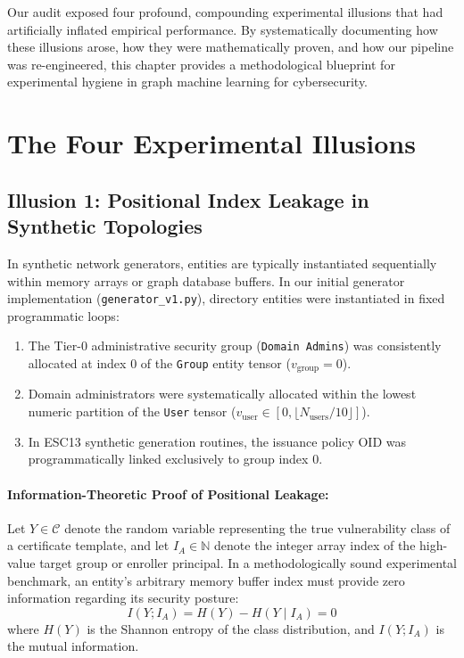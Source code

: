 Our audit exposed four profound, compounding experimental illusions that had artificially inflated empirical performance. By systematically documenting how these illusions arose, how they were mathematically proven, and how our pipeline was re-engineered, this chapter provides a methodological blueprint for experimental hygiene in graph machine learning for cybersecurity.

\section{The Four Experimental Illusions}

\subsection{Illusion 1: Positional Index Leakage in Synthetic Topologies}
In synthetic network generators, entities are typically instantiated sequentially within memory arrays or graph database buffers. In our initial generator implementation (\texttt{generator\_v1.py}), directory entities were instantiated in fixed programmatic loops:
\begin{enumerate}
    \item The Tier-0 administrative security group (\texttt{Domain Admins}) was consistently allocated at index $0$ of the \texttt{Group} entity tensor ($v_{\text{group}} = 0$).
    \item Domain administrators were systematically allocated within the lowest numeric partition of the \texttt{User} tensor ($v_{\text{user}} \in [0, \lfloor N_{\text{users}} / 10 \rfloor]$).
    \item In ESC13 synthetic generation routines, the issuance policy OID was programmatically linked exclusively to group index $0$.
\end{enumerate}

\paragraph{Information-Theoretic Proof of Positional Leakage:}
Let $Y \in \mathcal{C}$ denote the random variable representing the true vulnerability class of a certificate template, and let $I_A \in \mathbb{N}$ denote the integer array index of the high-value target group or enroller principal. In a methodologically sound experimental benchmark, an entity's arbitrary memory buffer index must provide zero information regarding its security posture:
\begin{equation}
I(Y; I_A) = H(Y) - H(Y \mid I_A) = 0
\end{equation}
where $H(Y)$ is the Shannon entropy of the class distribution, and $I(Y; I_A)$ is the mutual information.

